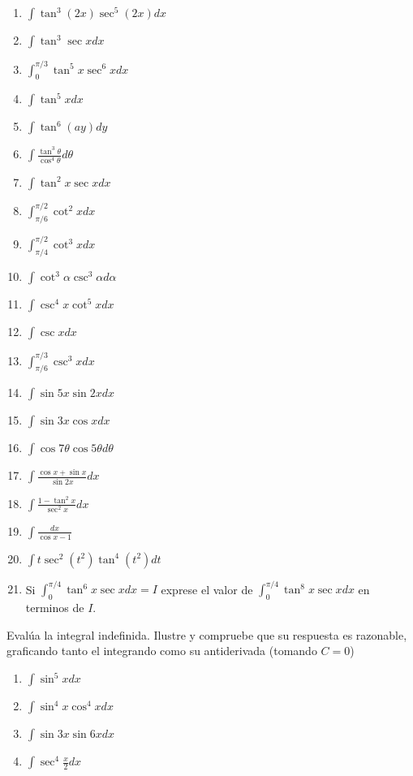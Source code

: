 \documentclass[12pt,]{article}
\begin{document}
\begin{enumerate}
\item
  \(\displaystyle\int\tan^3(2x)\sec^5(2x)dx\)
\item
  \(\displaystyle\int\tan^3\sec xdx\)
\item
  \(\displaystyle\int_0^{\pi/3}\tan^5x\sec^6xdx\)
\item
  \(\displaystyle\int\tan^5x dx\)
\item
  \(\displaystyle\int\tan^6(ay)dy\)
\item
  \(\displaystyle\int\frac{\tan^3\theta}{\cos^4\theta}d\theta\)
\item
  \(\displaystyle\int\tan^2x \sec xdx\)
\item
  \(\displaystyle\int_{\pi/6}^{\pi/2}\cot^2 x dx\)
\item
  \(\displaystyle\int_{\pi/4}^{\pi/2}\cot^3x dx\)
\item
  \(\displaystyle\int\cot^3\alpha\csc^3\alpha d\alpha\)
\item
  \(\displaystyle\int\csc^4x\cot^5x dx\)
\item
  \(\displaystyle\int\csc x dx\)
\item
  \(\displaystyle\int_{\pi/6}^{\pi/3}\csc^3x dx\)
\item
  \(\displaystyle\int\sin 5x\sin 2x dx\)
\item
  \(\displaystyle\int\sin 3x\cos x dx\)
\item
  \(\displaystyle\int\cos 7\theta\cos 5\theta d\theta\)
\item
  \(\displaystyle\int\frac{\cos x+\sin x}{\sin 2x}dx\)
\item
  \(\displaystyle\int\frac{1-\tan^2x}{\sec^2x}dx\)
\item
  \(\displaystyle\int\frac{dx}{\cos x-1}\)
\item
  \(\displaystyle\int t\sec^2(t^2)\tan^4(t^2)dt\)
\item
  Si \(\displaystyle\int_0^{\pi/4}\tan^6x\sec xdx=I\) exprese el valor
  de \(\displaystyle\int_0^{\pi/4}\tan^8x \sec x dx\) en terminos de
  \(I\).
\end{enumerate}

Evalúa la integral indefinida. Ilustre y compruebe que su respuesta es
razonable, graficando tanto el integrando como su antiderivada (tomando
\(C=0\))

\begin{enumerate}
\def\labelenumi{\arabic{enumi}.}
\setcounter{enumi}{48}
\item
  \(\displaystyle\int\sin^5xdx\)
\item
  \(\displaystyle\int\sin^4x\cos^4xdx\)
\item
  \(\displaystyle\int\sin 3x\sin 6x dx\)
\item
  \(\displaystyle\int\sec^4 \frac{x}{2}dx\)
\end{enumerate}
\end{document}
